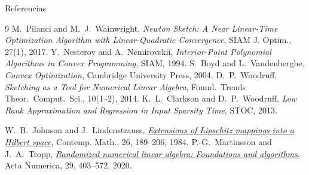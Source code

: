 \documentclass[aspectratio=169,11pt]{beamer}
\begin{document}
\begin{frame}[allowframebreaks]{Referencias}
  \footnotesize
  \begin{thebibliography}{9}
     M.~Pilanci and M.~J.~Wainwright, \emph{Newton Sketch: A Near Linear-Time Optimization Algorithm with Linear-Quadratic Convergence}, SIAM J. Optim., 27(1), 2017.
     Y.~Nesterov and A.~Nemirovskii, \emph{Interior-Point Polynomial Algorithms in Convex Programming}, SIAM, 1994.
     S.~Boyd and L.~Vandenberghe, \emph{Convex Optimization}, Cambridge University Press, 2004.
     D.~P.~Woodruff, \emph{Sketching as a Tool for Numerical Linear Algebra}, Found.\ Trends Theor.\ Comput.\ Sci., 10(1--2), 2014.
     K.~L.~Clarkson and D.~P.~Woodruff, \emph{Low Rank Approximation and Regression in Input Sparsity Time}, STOC, 2013.

     W.~B.~Johnson and J.~Lindenstrauss,
    \href{https://doi.org/10.1090/conm/026/737400}{\emph{Extensions of Lipschitz mappings into a Hilbert space}},
    Contemp. Math., 26, 189--206, 1984.
     P.-G.~Martinsson and J.~A.~Tropp,
    \href{https://doi.org/10.1017/S0962492920000021}{\emph{Randomized numerical linear algebra: Foundations and algorithms}},
    Acta Numerica, 29, 403--572, 2020.
  \end{thebibliography}
\end{frame}
\end{document}
